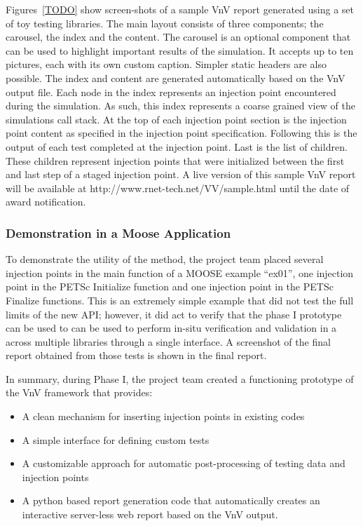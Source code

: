Figures~\ref{TODO} show screen-shots of a sample VnV report generated using a set of toy testing libraries. The main layout consists of three components; the carousel, the index and the content. The carousel is an optional component that can be used to highlight important results of the simulation. It accepts up to ten pictures, each with its own custom caption. Simpler static headers are also possible. The index and content are generated automatically based on the VnV output file. Each node in the index represents an injection point encountered during the simulation. As such, this index represents a coarse grained view of the simulations call stack. At the top of each injection point section is the injection point content as specified in the injection point specification. Following this is the output of each test completed at the injection point. Last is the list of children. These children represent injection points that were initialized between the first and last step of a staged injection point. A live version of this sample VnV report will be available at http://www.rnet-tech.net/VV/sample.html until the date of award notification. 




\subsubsection{ Demonstration in a Moose Application } 
To demonstrate the utility of the method, the project team placed several injection points 
in the main function of a MOOSE example ``ex01'', one injection point in the PETSc Initialize function and 
one injection point in the PETSc Finalize functions. This is an extremely simple example that 
did not test the full limits of the new API; however, it did act to verify that the phase I prototype 
can be used to can be used to perform in-situ verification and validation in a across multiple libraries 
through a single interface. A screenshot of the final \VV report obtained from those tests is shown in the 
final report. 

In summary, during Phase I, the project team created a functioning prototype of the VnV framework that provides:
\begin{itemize}
 \item A clean mechanism for inserting injection points in existing codes
 \item A simple interface for defining custom tests 
 \item A customizable approach for automatic post-processing of testing data and injection points
 \item A python based report generation code that automatically creates an interactive server-less web report based on the VnV output.
\end{itemize}

